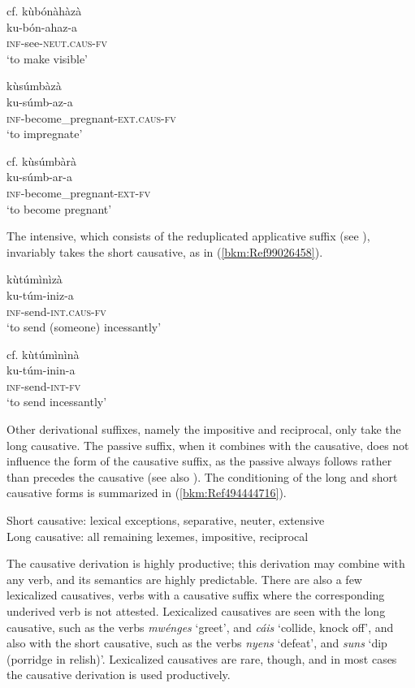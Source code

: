 \ex
 cf. kùbónàhàzà\\
ku-bón-ahaz-a\\
\textsc{inf}-see-\textsc{neut}.\textsc{caus}-\textsc{fv}\\
\glt ‘to make visible’
\z\z

\ea
\label{bkm:Ref99026173}
\ea
\glll kùsúmbàzà \\
ku-súmb-az-a\\
\textsc{inf}-become\_pregnant-\textsc{ext}.\textsc{caus}-\textsc{fv}\\
\glt ‘to impregnate’

\ex
 cf. kùsúmbàrà\\
ku-súmb-ar-a\\
\textsc{inf}-become\_pregnant-\textsc{ext}-\textsc{fv}\\
\glt ‘to become pregnant’
\z\z

The intensive, which consists of the reduplicated applicative suffix (see ), invariably takes the short causative, as in (\ref{bkm:Ref99026458}).

\ea
\label{bkm:Ref99026458}
\ea
\glll kùtúmìnìzà\\
ku-túm-iniz-a\\
\textsc{inf}-send-\textsc{int}.\textsc{caus}-\textsc{fv}\\
\glt ‘to send (someone) incessantly’

\ex
 cf. kùtúmìnìnà\\
ku-túm-inin-a\\
\textsc{inf}-send-\textsc{int}-\textsc{fv}\\
\glt ‘to send incessantly’
\z\z

Other derivational suffixes, namely the impositive and reciprocal, only take the long causative. The passive suffix, when it combines with the causative, does not influence the form of the causative suffix, as the passive always follows rather than precedes the causative (see also ). The conditioning of the long and short causative forms is summarized in (\ref{bkm:Ref494444716}).

\ea
\label{bkm:Ref494444716}
Short causative: lexical exceptions, separative, neuter, extensive\\
Long causative: all remaining lexemes, impositive, reciprocal\\
\z

The causative derivation is highly productive; this derivation may combine with any verb, and its semantics are highly predictable. There are also a few lexicalized causatives, verbs with a causative suffix where the corresponding underived verb is not attested. Lexicalized causatives are seen with the long causative, such as the verbs \textit{mwénges} ‘greet’, and \textit{cáis} ‘collide, knock off’, and also with the short causative, such as the verbs \textit{nyens} ‘defeat’, and \textit{suns} ‘dip (porridge in relish)’. Lexicalized causatives are rare, though, and in most cases the causative derivation is used productively.

